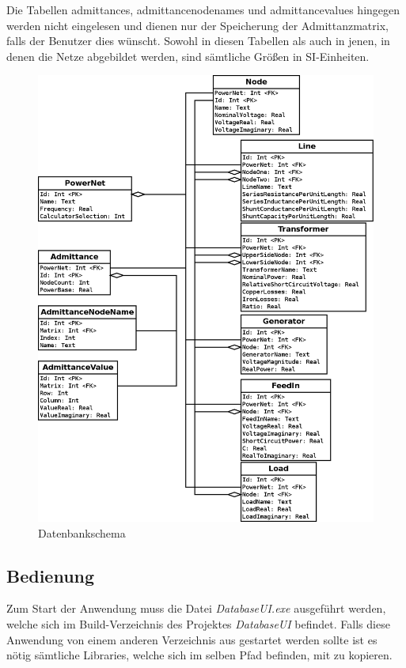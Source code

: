 \documentclass[12pt,a4paper]{article}
\begin{document}
	Die Tabellen admittances, admittancenodenames und admittancevalues hingegen werden nicht eingelesen und dienen nur der Speicherung der Admittanzmatrix, falls der Benutzer dies wünscht. Sowohl in diesen Tabellen als auch in jenen, in denen die Netze abgebildet werden, sind sämtliche Größen in SI-Einheiten.
	
	\begin{figure}
		\centering
		\includegraphics[scale=0.35]{pictures/database_schema}
		\caption{Datenbankschema}
		\label{fig:database_schema}
	\end{figure}
	
	\subsection{Bedienung}
	Zum Start der Anwendung muss die Datei \emph{DatabaseUI.exe} ausgeführt werden, welche sich im Build-Verzeichnis des Projektes \emph{DatabaseUI} befindet. Falls diese Anwendung von einem anderen Verzeichnis aus gestartet werden sollte ist es nötig sämtliche Libraries, welche sich im selben Pfad befinden, mit zu kopieren.
	
\end{document}
